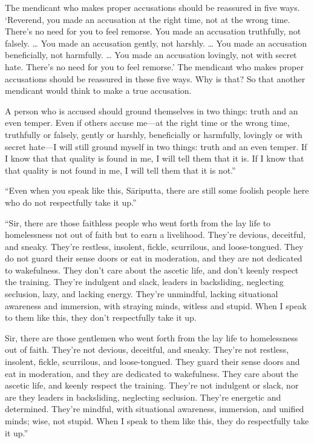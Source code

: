 \documentclass[12pt,openany]{book}%
\begin{document}
The mendicant who makes proper accusations should be reassured in five ways. ‘Reverend, you made an accusation at the right time, not at the wrong time. There’s no need for you to feel remorse. You made an accusation truthfully, not falsely. … You made an accusation gently, not harshly. … You made an accusation beneficially, not harmfully. … You made an accusation lovingly, not with secret hate. There’s no need for you to feel remorse.’ The mendicant who makes proper accusations should be reassured in these five ways. Why is that? So that another mendicant would think to make a true accusation. 

A person who is accused should ground themselves in two things: truth and an even temper. Even if others accuse me—at the right time or the wrong time, truthfully or falsely, gently or harshly, beneficially or harmfully, lovingly or with secret hate—I will still ground myself in two things: truth and an even temper. If I know that that quality is found in me, I will tell them that it is. If I know that that quality is not found in me, I will tell them that it is not.” 

“Even when you speak like this, \textsanskrit{Sāriputta}, there are still some foolish people here who do not respectfully take it up.” 

“Sir, there are those faithless people who went forth from the lay life to homelessness not out of faith but to earn a livelihood. They’re devious, deceitful, and sneaky. They’re restless, insolent, fickle, scurrilous, and loose-tongued. They do not guard their sense doors or eat in moderation, and they are not dedicated to wakefulness. They don’t care about the ascetic life, and don’t keenly respect the training. They’re indulgent and slack, leaders in backsliding, neglecting seclusion, lazy, and lacking energy. They’re unmindful, lacking situational awareness and immersion, with straying minds, witless and stupid. When I speak to them like this, they don’t respectfully take it up. 

Sir, there are those gentlemen who went forth from the lay life to homelessness out of faith. They’re not devious, deceitful, and sneaky. They’re not restless, insolent, fickle, scurrilous, and loose-tongued. They guard their sense doors and eat in moderation, and they are dedicated to wakefulness. They care about the ascetic life, and keenly respect the training. They’re not indulgent or slack, nor are they leaders in backsliding, neglecting seclusion. They’re energetic and determined. They’re mindful, with situational awareness, immersion, and unified minds; wise, not stupid. When I speak to them like this, they do respectfully take it up.” 
\end{document}
